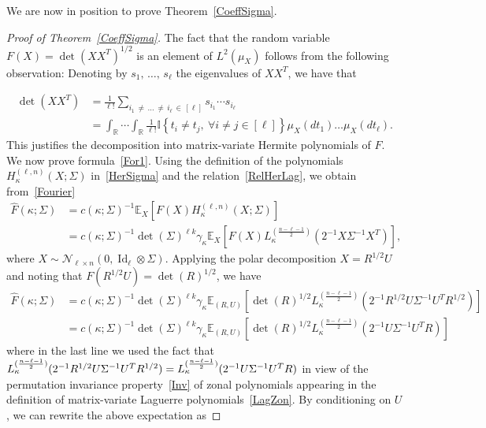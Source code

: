 \documentclass[10pt]{amsart}
\theoremstyle{definition}\newtheorem{defi}[theo]{Definition}\newtheorem{rema}[theo]{Remark}\newtheorem{exam}[theo]{Example}\newtheorem{exem}[theo]{Example}\newtheorem{nota}[theo]{Notation}
\DeclareMathOperator{\Id}{Id}
\newcommand{\scN}{\mathscr{N}}
\newcommand{\R}{\mathbb{R}}
\newcommand{\EX}[2]{\mathbb{E}_{#1}\left[#2\right]}
\newcommand{\ind}[1]{\mathbb{I}
\left\{#1\right\}}
\let\oldforall\forall
\renewcommand*{\forall}{\mathrel{\oldforall}}
\begin{document}
We are now in position to prove Theorem~\ref{CoeffSigma}.
\begin{proof}[Proof of Theorem~\ref{CoeffSigma}]
The fact that the random variable $F(X)= \det(XX^T)^{1/2}$ is an element of $L^2(\mu_X)$ follows from the following observation: Denoting by $s_1,\,\ldots,\,s_{\ell}$ the eigenvalues of $XX^T$, we have that

\break
\begin{align*}
\det\left(XX^T\right) &= \frac{1}{\ell!} \sum_{i_1\,\neq\,\ldots\,\neq\,i_{\ell}\,\in\,[\ell]} s_{i_1} \cdots s_{i_{\ell}}\\ &= \int_{\R}\cdots \int_{\R}
\frac{1}{\ell!} \ind{t_i \neq t_j, \ \forall i\neq j \in [\ell] }
\mu_X(dt_1)\ldots\mu_X(dt_{\ell}).
\end{align*}
This justifies the decomposition into matrix-variate Hermite polynomials of $F$. We now prove formula~\eqref{For1}. Using the definition of the polynomials $H_{\kappa}^{(\ell,n)}(X;\Sigma)$ in~\eqref{HerSigma} and the relation~\eqref{RelHerLag}, we obtain from~\eqref{Fourier}
\begin{align*}
\widehat{F}(\kappa; \Sigma) &= c(\kappa;\Sigma)^{-1}
\EX{X}{F(X) H^{(\ell,n)}_{\kappa}(X;\Sigma)} \\
&= c(\kappa;\Sigma)^{-1} \det(\Sigma)^{\ell k} \gamma_{\kappa}
\EX{X}{F(X) L_{\kappa}^{\left(\frac{n-\ell-1}{2}\right)}\left(2^{-1}X\Sigma^{-1}X^T\right)},
\end{align*}
where $X \sim \scN_{\ell\times n}(0,\Id_{\ell}\otimes \Sigma)$. Applying the polar decomposition $X= R^{1/2}U$ and noting that $F(R^{1/2}U)=\det(R)^{1/2}$, we have
\begin{align*}
\widehat{F}(\kappa; \Sigma) &= c(\kappa;\Sigma)^{-1} \det(\Sigma)^{\ell k} \gamma_{\kappa}
\EX{(R,U)}{ \det(R)^{1/2} L_{\kappa}^{\left(\frac{n-\ell-1}{2}\right)}\left(2^{-1}R^{1/2}U\Sigma^{-1}U^TR^{1/2}\right) } \\
&= c(\kappa;\Sigma)^{-1} \det(\Sigma)^{\ell k} \gamma_{\kappa}
\EX{(R,U)}{ \det(R)^{1/2} L_{\kappa}^{\left(\frac{n-\ell-1}{2}\right)}\left(2^{-1}U\Sigma^{-1}U^TR\right) }
\end{align*}
where in the last line we used the fact that $L_{\kappa}^{(\frac{n-\ell-1}{2})}(2^{-1}R^{1/2}U\Sigma^{-1}U^TR^{1/2}) =L_{\kappa}^{(\frac{n-\ell-1}{2})}\linebreak(2^{-1}U\Sigma^{-1}U^TR)$ in view of the permutation invariance property~\eqref{Inv} of zonal polynomials appearing in the definition of matrix-variate Laguerre polynomials~\eqref{LagZon}. By conditioning on $U$, we can rewrite the above expectation as

\end{proof}
\end{document}
